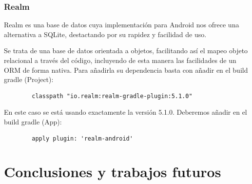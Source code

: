 \documentclass[12pt,a4paper,oneside]{book} %
\begin{document}
\subsection{Realm}
Realm es una base de datos cuya implementación para Android nos ofrece una alternativa a SQLite, destactando por su rapidez y facilidad de uso. 

Se trata de una base de datos orientada a objetos, facilitando así el mapeo objeto relacional a través del código, incluyendo de esta manera las facilidades de un ORM de forma nativa. 
\newline \newline
Para añadirla su dependencia basta con añadir en el build gradle (Project): 
\begin{verbatim}
		classpath "io.realm:realm-gradle-plugin:5.1.0"
\end{verbatim}
En este caso se está usando exactamente la versión 5.1.0. Deberemos añadir en el build gradle (App): 
\begin{verbatim}
		apply plugin: 'realm-android'

\end{verbatim}






\chapter{Conclusiones y trabajos futuros}






\pagebreak
\thispagestyle{empty}
\pagestyle{empty}



\end{document}
